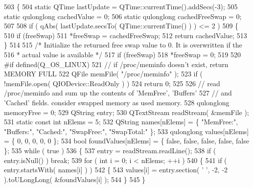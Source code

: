 \begin{DoxyCode}
503 \{
504     \textcolor{keyword}{static} QTime lastUpdate = QTime::currentTime().addSecs(-3);
505     \textcolor{keyword}{static} qulonglong cachedValue = 0;
506     \textcolor{keyword}{static} qulonglong cachedFreeSwap = 0;
507 
508     \textcolor{keywordflow}{if} ( qAbs( lastUpdate.secsTo( QTime::currentTime() ) ) <= 2 )
509     \{
510         \textcolor{keywordflow}{if} (freeSwap)
511             *freeSwap = cachedFreeSwap;
512         \textcolor{keywordflow}{return} cachedValue;
513     \}
514 
515     \textcolor{comment}{/* Initialize the returned free swap value to 0. It is overwritten if the}
516 \textcolor{comment}{     * actual value is available */}
517     \textcolor{keywordflow}{if} (freeSwap)
518         *freeSwap = 0;
519 
520 \textcolor{preprocessor}{#if defined(Q\_OS\_LINUX)}
521     \textcolor{comment}{// if /proc/meminfo doesn't exist, return MEMORY FULL}
522     QFile memFile( \textcolor{stringliteral}{"/proc/meminfo"} );
523     \textcolor{keywordflow}{if} ( !memFile.open( QIODevice::ReadOnly ) )
524         \textcolor{keywordflow}{return} 0;
525 
526     \textcolor{comment}{// read /proc/meminfo and sum up the contents of 'MemFree', 'Buffers'}
527     \textcolor{comment}{// and 'Cached' fields. consider swapped memory as used memory.}
528     qulonglong memoryFree = 0;
529     QString entry;
530     QTextStream readStream( &memFile );
531     \textcolor{keyword}{static} \textcolor{keyword}{const} \textcolor{keywordtype}{int} nElems = 5;
532     QString names[nElems] = \{ \textcolor{stringliteral}{"MemFree:"}, \textcolor{stringliteral}{"Buffers:"}, \textcolor{stringliteral}{"Cached:"}, \textcolor{stringliteral}{"SwapFree:"}, \textcolor{stringliteral}{"SwapTotal:"} \};
533     qulonglong values[nElems] = \{ 0, 0, 0, 0, 0 \};
534     \textcolor{keywordtype}{bool} foundValues[nElems] = \{ \textcolor{keyword}{false}, \textcolor{keyword}{false}, \textcolor{keyword}{false}, \textcolor{keyword}{false}, \textcolor{keyword}{false} \};
535     \textcolor{keywordflow}{while} ( \textcolor{keyword}{true} )
536     \{
537         entry = readStream.readLine();
538         \textcolor{keywordflow}{if} ( entry.isNull() ) \textcolor{keywordflow}{break};
539         \textcolor{keywordflow}{for} ( \textcolor{keywordtype}{int} i = 0; i < nElems; ++i )
540         \{
541             \textcolor{keywordflow}{if} ( entry.startsWith( names[i] ) )
542             \{
543                 values[i] = entry.section( \textcolor{charliteral}{' '}, -2, -2 ).toULongLong( &foundValues[i] );
544             \}
545         \}

\end{DoxyCode}
